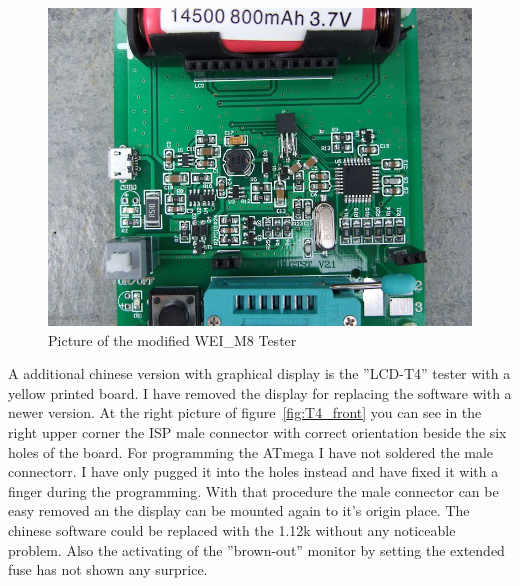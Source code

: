 \begin{figure}[H]
\centering
\includegraphics[width=12cm]{../PNG/WEI_M8_modified.JPG}
\caption{Picture of the modified WEI\_M8 Tester}
\label{fig:WeiM8mod}
\end{figure}

A additional chinese version with graphical display is the ''LCD-T4'' tester with a yellow 
printed board.
I have removed the display for replacing the software with a newer version.
At the right picture of figure~\ref{fig:T4_front} you can see in the right upper corner the ISP male connector
with correct orientation beside the six holes of the board.
For programming the ATmega I have not soldered the male connectorr. I have only pugged it into
the holes instead and have fixed it with a finger during the programming.
With that procedure the male connector can be easy removed an the display can be mounted again to
it's origin place.
The chinese software could be replaced with the 1.12k without any noticeable problem. 
Also the activating of the ''brown-out'' monitor by setting the extended fuse has not
shown any surprice.

